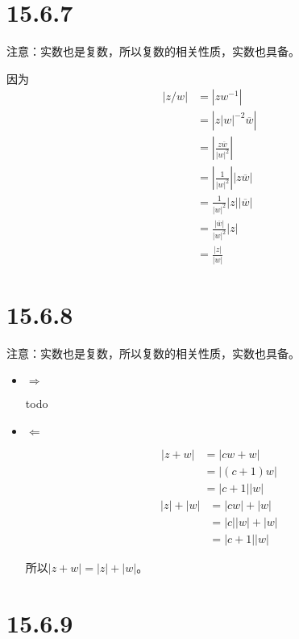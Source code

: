 \documentclass{article}
\begin{document}
\section*{15.6.7}

注意：实数也是复数，所以复数的相关性质，实数也具备。

因为
\begin{align*}
  |z/w| & = |zw^{-1}|                                \\
        & = \left|z|w|^{-2}\overline{w}\right|       \\
        & = \left|\frac{z\overline{w}}{|w|^2}\right| \\
        & = |\frac{1}{|w|^2}| |z\overline{w}|        \\
        & = \frac{1}{|w|^2} |z| |\overline{w}|       \\
        & = \frac{|\overline{w}|}{|w|^2} |z|         \\
        & = \frac{|z|}{|w|}
\end{align*}

\section*{15.6.8}

注意：实数也是复数，所以复数的相关性质，实数也具备。

\begin{itemize}
  \item $\Rightarrow$

        todo



  \item $\Leftarrow$

        \begin{align*}
          |z + w| & = |cw + w|    \\
                  & = |(c + 1) w| \\
                  & = |c + 1| |w|
        \end{align*}
        \begin{align*}
          |z| + |w| & = |cw| + |w|    \\
                    & = |c| |w| + |w| \\
                    & = |c + 1| |w|
        \end{align*}

        所以$|z + w| = |z| + |w|$。
\end{itemize}

\section*{15.6.9}
\end{document}
